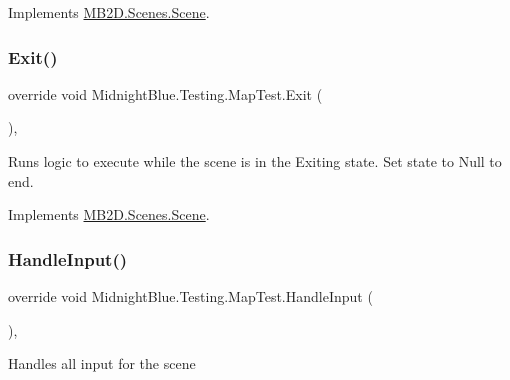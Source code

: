 Implements \hyperlink{class_m_b2_d_1_1_scenes_1_1_scene_a932d33071ecb4c5187367825dba72324}{M\+B2\+D.\+Scenes.\+Scene}.

\hypertarget{class_midnight_blue_1_1_testing_1_1_map_test_a7dfcf609b9fd898f377297a0075d2159}{}\label{class_midnight_blue_1_1_testing_1_1_map_test_a7dfcf609b9fd898f377297a0075d2159} 
\subsubsection{\texorpdfstring{Exit()}{Exit()}}
{\footnotesize\ttfamily override void Midnight\+Blue.\+Testing.\+Map\+Test.\+Exit (\begin{DoxyParamCaption}{ }\end{DoxyParamCaption})\hspace{0.3cm}{\ttfamily [inline]}, {\ttfamily [virtual]}}



Runs logic to execute while the scene is in the Exiting state. Set state to Null to end. 



Implements \hyperlink{class_m_b2_d_1_1_scenes_1_1_scene_a099b79e16d23b67349847999d2336813}{M\+B2\+D.\+Scenes.\+Scene}.

\hypertarget{class_midnight_blue_1_1_testing_1_1_map_test_ad7e54e4aec415ccf6e89ce8a8876d259}{}\label{class_midnight_blue_1_1_testing_1_1_map_test_ad7e54e4aec415ccf6e89ce8a8876d259} 
\subsubsection{\texorpdfstring{Handle\+Input()}{HandleInput()}}
{\footnotesize\ttfamily override void Midnight\+Blue.\+Testing.\+Map\+Test.\+Handle\+Input (\begin{DoxyParamCaption}{ }\end{DoxyParamCaption})\hspace{0.3cm}{\ttfamily [inline]}, {\ttfamily [virtual]}}



Handles all input for the scene 



